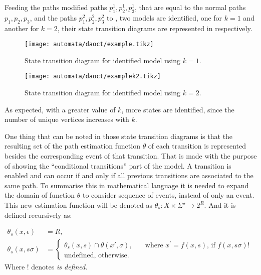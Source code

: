 \vspace{1cm}

Feeding the paths modified paths $p_1^1,p_2^1,p_3^1$, that are equal to the
normal paths $p_1,p_2,p_3$, and the paths $p_1^2,p_2^2,p_3^2$ to , two models are identified, one for $k=1$ and another for
$k=2$, their state transition diagrams are represented in  respectively. 

\begin{figure}[H]
  \centering \texttt{[image: automata/daoct/example.tikz]}
  \caption{State transition diagram for identified model using $k=1$.}
  \label{fig:examplek1}
\end{figure}


\begin{figure}[H]
  \centering \texttt{[image: automata/daoct/examplek2.tikz]}
  \caption{State transition diagram for identified model using $k=2$.}
  \label{fig:examplek2}
\end{figure}

As expected, with a greater value of $k$, more states are identified, since the
number of unique vertices increases with $k$.

One thing that can be noted in those state transition diagrams is that the
resulting set
of the path estimation function $\theta$ of each transition is represented
besides the corresponding event of that transition. That is made with the
purpose of showing the ``conditional transitions'' part of the \DAOCT{} model. A
transition is enabled and can occur if and only if all previous transitions are
associated to the same path. To summarise this in mathematical language it is
needed to expand the domain of function $\theta$ to consider sequence of events,
instead of only an event. This new estimation function will be denoted as
$\theta_s : X \times \Sigma^\star \rightarrow 2^R$. And it is defined
recursively as:

\begin{align}
  \theta_s(x,\epsilon)&=R,\nonumber\\
  \theta_s(x,s\sigma)&=
                       \begin{cases}
                         \theta_s(x,s) \cap \theta(x',\sigma),       & \quad \text{where $x^\prime = f(x,s)$, if $f(x,s\sigma)!$ }\\
                         \text{undefined, otherwise.}  &
                       \end{cases}
\end{align}
Where ! denotes \emph{is defined}.

